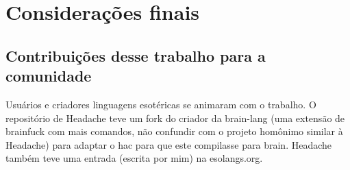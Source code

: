 %
%
% 
%

\chapter{Considerações finais}
\noindent

\section{Contribuições desse trabalho para a comunidade}
Usuários e criadores linguagens esotéricas se animaram com o trabalho. O repositório de Headache teve um fork do criador da brain-lang (uma extensão de brainfuck com mais comandos, não confundir com o projeto homônimo similar à Headache)  para adaptar o hac para que este compilasse para brain. Headache também teve uma entrada (escrita por mim) na esolangs.org. 

